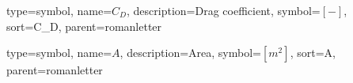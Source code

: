 {
type=symbol, %
name={\ensuremath{C_D}}, %
description={Drag coefficient}, %
symbol={$\left[-\right]$}, %
sort=C\_D, %
parent=romanletter %
}

{
type=symbol, %
name={\ensuremath{A}}, %
description={Area}, %
symbol={$\left[m^2\right]$}, %
sort=A, %
parent=romanletter %
}


